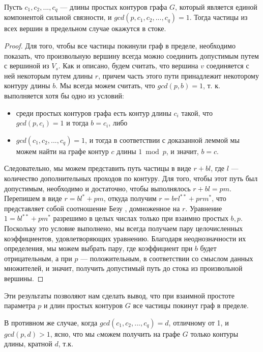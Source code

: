\begin{theorem}
	Пусть $c_1, c_2, ... , c_q $ --- длины простых контуров графа $G$, который является единой компонентой сильной связности, и $gcd(p, c_1, c_2, ... , c_q) = 1$. Тогда частицы из всех вершин в предельном случае окажутся в стоке.
\end{theorem}

\begin{proof}	
	Для того, чтобы все частицы покинули граф в пределе, необходимо показать, что произвольную вершину всегда можно соединить допустимым путем с вершиной из $V_s$. Как и описано, будем считать, что вершина $v$ соединяется с ней некоторым путем длины $r$, причем часть этого пути принадлежит некоторому контуру длины $b$. Мы всегда можем считать, что $gcd(p, b) = 1$, т. к. выполняется хотя бы одно из условий:
	
	\begin{itemize}
		\item среди простых контуров графа есть контур длины $c_i$ такой, что $gcd(p, c_i) = 1$ и тогда $b = c_i$, либо
		\item $gcd(c_1, c_2, ... , c_q) = 1$, и тогда в соответствии с доказанной леммой мы можем найти на графе контур $c$ длины  $1\bmod p$, и значит, $b = c$.
	\end{itemize}
	
	Следовательно, мы можем представить путь частицы в виде $r + bl$, где $l$ --- количество дополнительных проходов по контуру. Для того, чтобы этот путь был допустимым, необходимо и достаточно, чтобы выполнялось $r + bl = pm$. Перепишем в виде $r = bl^* + pm$, откуда получим $r = brl^{**} + prm^*$, что представляет собой соотношение Безу \cite{Hasse}, домноженное на $r$. Уравнение $1  =bl^{**} + pm^*$ разрешимо в целых числах только при взаимно простых $b, p$. Поскольку это условие выполнено, мы всегда получаем пару целочисленных коэффициентов, удовлетворяющих уравнению. Благодаря неоднозначности их определения, мы можем выбрать пару, где коэффициент при $b$ будет отрицательным, а при $p$ --- положительным, в соответствии со смыслом данных множителей, и значит, получить допустимый путь до стока из произвольной вершины.
\end{proof}

Эти результаты позволяют нам сделать вывод, что при взаимной простоте параметра $p$ и длин простых контуров $G$ все частицы покинут граф в пределе. 

В противном же случае, когда $gcd(c_1, c_2, ... , c_q) = d$, отличному от 1, и $gcd(p,d) > 1$, ясно, что мы cможем получить на графе $G$ только контуры длины, кратной $d$, т.к. 

